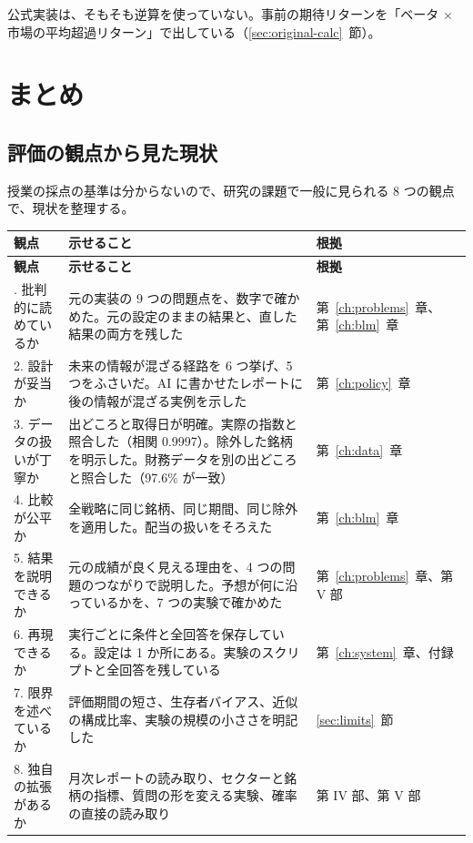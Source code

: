 \documentclass[xelatex,ja=standard,jafont=hiragino-pron,a4paper,10pt]{bxjsreport}
\newcommand{\chapref}[1]{第~\ref{#1}~章}
\newcommand{\secref}[1]{\ref{#1}~節}
\begin{document}
公式実装は、そもそも逆算を使っていない。事前の期待リターンを「ベータ $\times$ 市場の平均超過リターン」で出している（\secref{sec:original-calc}）。

\part{まとめ}

\chapter{評価の観点から見た現状}\label{ch:eval}

授業の採点の基準は分からないので、研究の課題で一般に見られる 8 つの観点で、現状を整理する。

\begin{longtable}{p{3.40cm}p{6.00cm}p{5.00cm}}
\toprule
\textbf{観点} & \textbf{示せること} & \textbf{根拠} \\
\midrule
\endfirsthead
\toprule
\textbf{観点} & \textbf{示せること} & \textbf{根拠} \\
\midrule
\endhead
\bottomrule
\endfoot
1. 批判的に読めているか & 元の実装の 9 つの問題点を、数字で確かめた。元の設定のままの結果と、直した結果の両方を残した & \chapref{ch:problems}、\chapref{ch:blm} \\
2. 設計が妥当か & 未来の情報が混ざる経路を 6 つ挙げ、5 つをふさいだ。AI に書かせたレポートに後の情報が混ざる実例を示した & \chapref{ch:policy} \\
3. データの扱いが丁寧か & 出どころと取得日が明確。実際の指数と照合した（相関 0.9997）。除外した銘柄を明示した。財務データを別の出どころと照合した（97.6\% が一致） & \chapref{ch:data} \\
4. 比較が公平か & 全戦略に同じ銘柄、同じ期間、同じ除外を適用した。配当の扱いをそろえた & \chapref{ch:blm} \\
5. 結果を説明できるか & 元の成績が良く見える理由を、4 つの問題のつながりで説明した。予想が何に沿っているかを、7 つの実験で確かめた & \chapref{ch:problems}、第 V 部 \\
6. 再現できるか & 実行ごとに条件と全回答を保存している。設定は 1 か所にある。実験のスクリプトと全回答を残している & \chapref{ch:system}、付録 \\
7. 限界を述べているか & 評価期間の短さ、生存者バイアス、近似の構成比率、実験の規模の小ささを明記した & \secref{sec:limits} \\
8. 独自の拡張があるか & 月次レポートの読み取り、セクターと銘柄の指標、質問の形を変える実験、確率の直接の読み取り & 第 IV 部、第 V 部 \\
\end{longtable}
\end{document}
